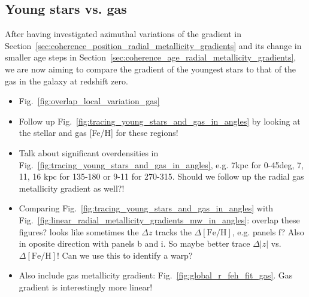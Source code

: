 \documentclass[fleqn,usenatbib]{mnras}
\begin{document}
\subsection{Young stars vs. gas}
\label{sec:young_stars_vs_gas}

After having investigated azimuthal variations of the gradient in Section~\ref{sec:coherence_position_radial_metallicity_gradients} and its change in smaller age steps in Section~\ref{sec:coherence_age_radial_metallicity_gradients}, we are now aiming to compare the gradient of the youngest stars to that of the gas in the galaxy at redshift zero.

\begin{itemize}
    \item Fig.~\ref{fig:overlap_local_variation_gas}
    \item Follow up Fig.~\ref{fig:tracing_young_stars_and_gas_in_angles} by looking at the stellar and gas [Fe/H] for these regions!
    \item Talk about significant overdensities in Fig.~\ref{fig:tracing_young_stars_and_gas_in_angles}, e.g. 7kpc for 0-45deg, 7, 11, 16 kpc for 135-180 or 9-11 for 270-315. Should we follow up the radial gas metallicity gradient as well?!
    \item Comparing Fig.~\ref{fig:tracing_young_stars_and_gas_in_angles} with Fig.~\ref{fig:linear_radial_metallicity_gradients_mw_in_angles}: overlap these figures? looks like sometimes the $\Delta z$ tracks the $\Delta\mathrm{[Fe/H]}$, e.g. panels f? Also in oposite direction with panels b and i. So maybe better trace $\Delta \vert z \vert$ vs. $\Delta \mathrm{[Fe/H]}$! Can we use this to identify a warp?
    \item Also include gas metallicity gradient: Fig.~\ref{fig:global_r_feh_fit_gas}. Gas gradient is interestingly more linear!
\end{itemize}
\end{document}
